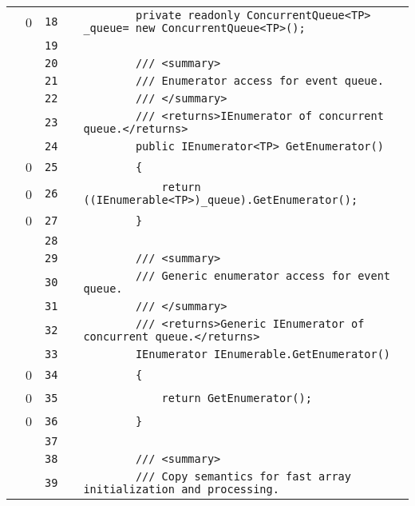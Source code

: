 \documentclass[a4paper,landscape,10pt]{article}
\begin{document}
\begin{longtable}[l]{lrrll}
\cellcolor{red} & 0 & \verb~18~ & & \verb~        private readonly ConcurrentQueue<TP> _queue= new ConcurrentQueue<TP>();~\\
\cellcolor{gray} &  & \verb~19~ & & \verb~~\\
\cellcolor{gray} &  & \verb~20~ & & \verb~        /// <summary>~\\
\cellcolor{gray} &  & \verb~21~ & & \verb~        /// Enumerator access for event queue.~\\
\cellcolor{gray} &  & \verb~22~ & & \verb~        /// </summary>~\\
\cellcolor{gray} &  & \verb~23~ & & \verb~        /// <returns>IEnumerator of concurrent queue.</returns>~\\
\cellcolor{gray} &  & \verb~24~ & & \verb~        public IEnumerator<TP> GetEnumerator()~\\
\cellcolor{red} & 0 & \verb~25~ & & \verb~        {~\\
\cellcolor{red} & 0 & \verb~26~ & & \verb~            return ((IEnumerable<TP>)_queue).GetEnumerator();~\\
\cellcolor{red} & 0 & \verb~27~ & & \verb~        }~\\
\cellcolor{gray} &  & \verb~28~ & & \verb~~\\
\cellcolor{gray} &  & \verb~29~ & & \verb~        /// <summary>~\\
\cellcolor{gray} &  & \verb~30~ & & \verb~        /// Generic enumerator access for event queue.~\\
\cellcolor{gray} &  & \verb~31~ & & \verb~        /// </summary>~\\
\cellcolor{gray} &  & \verb~32~ & & \verb~        /// <returns>Generic IEnumerator of concurrent queue.</returns>~\\
\cellcolor{gray} &  & \verb~33~ & & \verb~        IEnumerator IEnumerable.GetEnumerator()~\\
\cellcolor{red} & 0 & \verb~34~ & & \verb~        {~\\
\cellcolor{red} & 0 & \verb~35~ & & \verb~            return GetEnumerator();~\\
\cellcolor{red} & 0 & \verb~36~ & & \verb~        }~\\
\cellcolor{gray} &  & \verb~37~ & & \verb~~\\
\cellcolor{gray} &  & \verb~38~ & & \verb~        /// <summary>~\\
\cellcolor{gray} &  & \verb~39~ & & \verb~        /// Copy semantics for fast array initialization and processing.~\\

\end{longtable}
\end{document}
